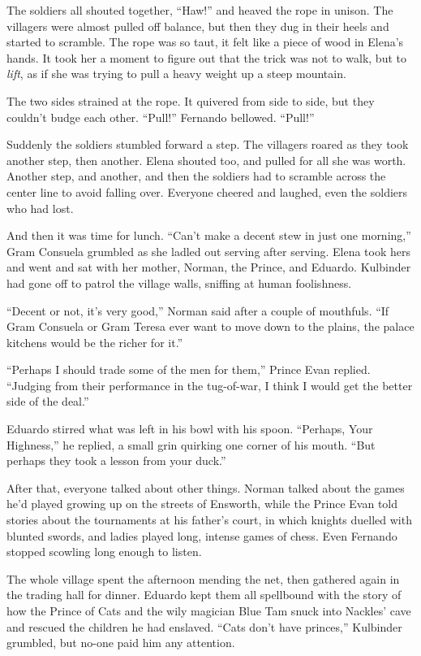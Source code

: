 \documentclass[10pt]{book}
\begin{document}
The soldiers all shouted together, ``Haw!'' and heaved the rope in unison. The villagers were almost pulled off balance, but then they dug in their heels and started to scramble. The rope was so taut, it felt like a piece of wood in Elena's hands. It took her a moment to figure out that the trick was not to walk, but to \emph{lift}, as if she was trying to pull a heavy weight up a steep mountain.

The two sides strained at the rope. It quivered from side to side, but they couldn't budge each other. ``Pull!'' Fernando bellowed. ``Pull!''

Suddenly the soldiers stumbled forward a step. The villagers roared as they took another step, then another. Elena shouted too, and pulled for all she was worth. Another step, and another, and then the soldiers had to scramble across the center line to avoid falling over. Everyone cheered and laughed, even the soldiers who had lost.

And then it was time for lunch. ``Can't make a decent stew in just one morning,'' Gram Consuela grumbled as she ladled out serving after serving. Elena took hers and went and sat with her mother, Norman, the Prince, and Eduardo. Kulbinder had gone off to patrol the village walls, sniffing at human foolishness.

``Decent or not, it's very good,'' Norman said after a couple of mouthfuls. ``If Gram Consuela or Gram Teresa ever want to move down to the plains, the palace kitchens would be the richer for it.''

``Perhaps I should trade some of the men for them,'' Prince Evan replied. ``Judging from their performance in the tug-of-war, I think I would get the better side of the deal.''

Eduardo stirred what was left in his bowl with his spoon. ``Perhaps, Your Highness,'' he replied, a small grin quirking one corner of his mouth. ``But perhaps they took a lesson from your duck.''

After that, everyone talked about other things. Norman talked about the games he'd played growing up on the streets of Ensworth, while the Prince Evan told stories about the tournaments at his father's court, in which knights duelled with blunted swords, and ladies played long, intense games of chess. Even Fernando stopped scowling long enough to listen.

The whole village spent the afternoon mending the net, then gathered again in the trading hall for dinner. Eduardo kept them all spellbound with the story of how the Prince of Cats and the wily magician Blue Tam snuck into Nackles' cave and rescued the children he had enslaved. ``Cats don't have princes,'' Kulbinder grumbled, but no-one paid him any attention.
\end{document}
